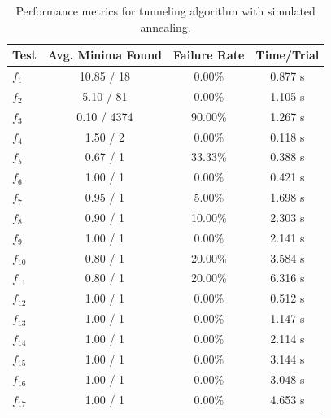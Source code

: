 \documentclass[a4paper,12pt,twoside]{article}
\begin{document}
\begin{table}[H]
    \centering
    \begin{tabular}{lccc}
        \hline
        \textbf{Test} & \textbf{Avg. Minima Found} & \textbf{Failure Rate} & \textbf{Time/Trial} \\
        \hline
        $f_1$ & 10.85 / 18 & 0.00\% & 0.877 s \\
        $f_2$ & 5.10 / 81 & 0.00\% & 1.105 s \\
        $f_3$ & 0.10 / 4374 & 90.00\% & 1.267 s \\
        $f_4$ & 1.50 / 2 & 0.00\% & 0.118 s \\
        $f_5$ & 0.67 / 1 & 33.33\% & 0.388 s \\
        $f_6$ & 1.00 / 1 & 0.00\% & 0.421 s \\
        $f_7$ & 0.95 / 1 & 5.00\% & 1.698 s \\
        $f_8$ & 0.90 / 1 & 10.00\% & 2.303 s \\
        $f_9$ & 1.00 / 1 & 0.00\% & 2.141 s \\
        $f_{10}$ & 0.80 / 1 & 20.00\% & 3.584 s \\
        $f_{11}$ & 0.80 / 1 & 20.00\% & 6.316 s \\
        $f_{12}$ & 1.00 / 1 & 0.00\% & 0.512 s \\
        $f_{13}$ & 1.00 / 1 & 0.00\% & 1.147 s \\
        $f_{14}$ & 1.00 / 1 & 0.00\% & 2.114 s \\
        $f_{15}$ & 1.00 / 1 & 0.00\% & 3.144 s \\
        $f_{16}$ & 1.00 / 1 & 0.00\% & 3.048 s \\
        $f_{17}$ & 1.00 / 1 & 0.00\% & 4.653 s \\
        \hline
    \end{tabular}
    \caption{Performance metrics for tunneling algorithm with simulated annealing.}
    \label{tab:annealing}
\end{table}


\printbibliography
\end{document}
